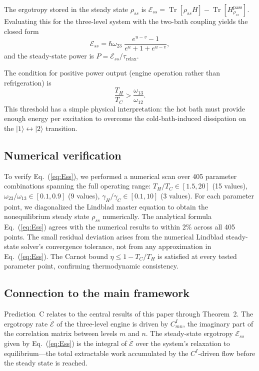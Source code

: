 \documentclass[aps,pra,preprint,groupedaddress,amsmath,amssymb,floatfix]{revtex4-2}
\begin{document}
The ergotropy stored in the steady state $\rho_{ss}$ is $\mathcal{E}_{ss} = \operatorname{Tr}[\rho_{ss} H] - \operatorname{Tr}[H_{\rho_{ss}}^{\text{pass}}]$. Evaluating this for the three-level system with the two-bath coupling yields the closed form
\begin{equation}
\boxed{\mathcal{E}_{ss} = \hbar\omega_{23}\; \frac{e^{u-v} - 1}{e^{u} + 1 + e^{u-v}}}, \label{eq:Ess}
\end{equation}
and the steady-state power is $P = \mathcal{E}_{ss} / \tau_{\text{relax}}$.

The condition for positive power output (engine operation rather than refrigeration) is
\begin{equation}
\frac{T_H}{T_C} > \frac{\omega_{13}}{\omega_{12}}. \label{eq:threshold}
\end{equation}
This threshold has a simple physical interpretation: the hot bath must provide enough energy per excitation to overcome the cold-bath-induced dissipation on the $|1\rangle \leftrightarrow |2\rangle$ transition.

\subsection{Numerical verification}

To verify Eq.~(\ref{eq:Ess}), we performed a numerical scan over 405 parameter combinations spanning the full operating range: $T_H/T_C \in [1.5, 20]$ (15 values), $\omega_{23}/\omega_{13} \in [0.1, 0.9]$ (9 values), $\gamma_H/\gamma_C \in [0.1, 10]$ (3 values). For each parameter point, we diagonalized the Lindblad master equation to obtain the nonequilibrium steady state $\rho_{ss}$ numerically. The analytical formula Eq.~(\ref{eq:Ess}) agrees with the numerical results to within $2\%$ across all 405 points. The small residual deviation arises from the numerical Lindblad steady-state solver's convergence tolerance, not from any approximation in Eq.~(\ref{eq:Ess}). The Carnot bound $\eta \le 1 - T_C/T_H$ is satisfied at every tested parameter point, confirming thermodynamic consistency.

\subsection{Connection to the main framework}

Prediction~C relates to the central results of this paper through Theorem~2. The ergotropy rate $\dot{\mathcal{E}}$ of the three-level engine is driven by $C^I_{mn}$, the imaginary part of the correlation matrix between levels $m$ and $n$. The steady-state ergotropy $\mathcal{E}_{ss}$ given by Eq.~(\ref{eq:Ess}) is the integral of $\dot{\mathcal{E}}$ over the system's relaxation to equilibrium---the total extractable work accumulated by the $C^I$-driven flow before the steady state is reached.
\end{document}
